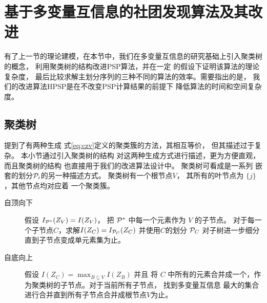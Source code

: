 \section{基于多变量互信息的社团发现算法及其改进}\label{sec:mmi_community_detection}
有了上一节的理论建模，在本节中，我们在多变量互信息的研究基础上引入聚类树的概念，
利用聚类树的结构改进PSP算法，并在一定
的假设下证明该算法的理论复杂度，
最后比较求解主划分序列的三种不同的算法的效率。需要指出的是，
我们的改进算法HPSP是在不改变PSP计算结果的前提下
降低算法的时间和空间复杂度。
\subsection{聚类树}

\citet{chan2020agglomerative} 提到了有两种生成
式\eqref{eq:czv}定义的聚类簇的方法，其相互等价，
但其描述过于复杂。
本小节通过引入聚类树的结构
对这两种生成方式进行描述，更为方便直观，而且聚类树的结构
也直接用于我们的改进算法设计中。
聚类树可看成是一系列
嵌套的划分$\P_i$的另一种描述方式。
聚类树有一个根节点$V$，
其所有的叶节点为 $\{j\}$，其他节点均对应着
一个聚类簇。

\begin{description}
  \item[自顶向下] 假设 $I_{\P^*}(Z_V)=I(Z_V)$，
  把 $\P^*$ 中每一个元素作为 $V$ 的子节点。
  对于每一个子节点$C$，求解$I(Z_C)=I_{\P_C}(Z_C)$
  并使用$C$的划分 $\P_C$ 对子树进一步细分直到子节点变成单元素集为止。
  \item[自底向上] 假设 $I(Z_C) = \max_{B\subseteq V} I(Z_B)$ 并且 
  将 $C$ 中所有的元素合并成一个，作为聚类树的子节点。对于当前所有子节点，
  找到多变量互信息
  最大的集合进行合并直到所有子节点合并成根节点$V$为止。
  \end{description}

